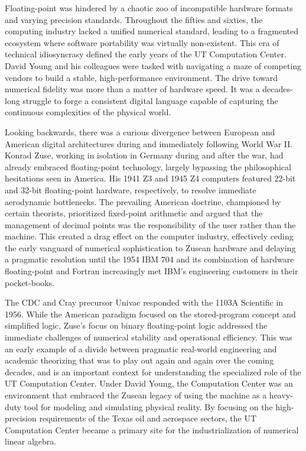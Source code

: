 Floating-point was hindered by a chaotic zoo of incompatible hardware formats and varying precision standards. Throughout the fifties and sixties, the computing industry lacked a unified numerical standard, leading to a fragmented ecosystem where software portability was virtually non-existent. This era of technical idiosyncrasy defined the early years of the UT Computation Center. David Young and his colleagues were tasked with navigating a maze of competing vendors to build a stable, high-performance environment. The drive toward numerical fidelity was more than a matter of hardware speed. It was a decades-long struggle to forge a consistent digital language capable of capturing the continuous complexities of the physical world. 

Looking backwards, there was a curious divergence between European and American digital architectures during and immediately following World War II. Konrad Zuse, working in isolation in Germany during and after the war, had already embraced floating-point technology, largely bypassing the philosophical hesitations seen in America. His 1941 Z3 and 1945 Z4 computers featured 22-bit and 32-bit floating-point hardware, respectively, to resolve immediate aerodynamic bottlenecks. The prevailing American doctrine, championed by certain theorists, prioritized fixed-point arithmetic and argued that the management of decimal points was the responsibility of the user rather than the machine. This created a drag effect on the computer industry, effectively ceding the early vanguard of numerical sophistication to Zusean hardware and delaying a pragmatic resolution until the 1954 IBM 704 and its combination of hardware floating-point and Fortran increasingly met IBM’s engineering customers in their pocket-books. 

The CDC and Cray precursor Univac responded with the 1103A Scientific in 1956. While the American paradigm focused on the stored-program concept and simplified logic, Zuse’s focus on binary floating-point logic addressed the immediate challenges of numerical stability and operational efficiency. This was an early example of a divide between pragmatic real-world engineering and academic theorizing that was to play out again and again over the coming decades, and is an important context for understanding the specialized role of the UT Computation Center. Under David Young, the Computation Center was an environment that embraced the Zusean legacy of using the machine as a heavy-duty tool for modeling and simulating physical reality. By focusing on the high-precision requirements of the Texas oil and aerospace sectors, the UT Computation Center became a primary site for the industrialization of numerical linear algebra. 

